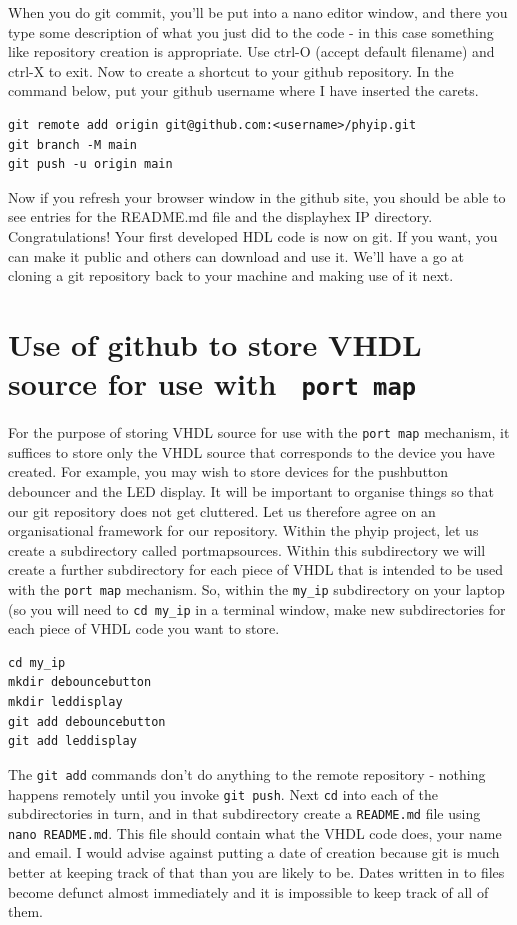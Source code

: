 \documentclass[../physical_computing.tex]{subfiles}
\begin{document}
When you do git commit, you'll be put into a nano editor window, and there you type some description of what you just did to the code - in this case
something like repository creation is appropriate. Use ctrl-O (accept default filename) and ctrl-X to exit. Now to create a shortcut to your github repository. In the command below, put your github username where I 
have inserted the carets.

\begin{verbatim}
git remote add origin git@github.com:<username>/phyip.git
git branch -M main
git push -u origin main
\end{verbatim}

Now if you refresh your browser window in the github site, you should be able to see entries for the README.md file and the displayhex IP directory. Congratulations! Your first developed HDL code is now on git. If you want, you can make it public and others can download and use it. We'll have a go at cloning a git repository back to your machine and making use of it next.

\section{Use of github to store VHDL source for use with \texttt{ port map}}
\label{sec:githubportmap}

For the purpose of storing VHDL source for use with the \texttt{port map} mechanism, it suffices to store only the VHDL source that corresponds to the device you have created. For example, you may wish to store devices for the pushbutton debouncer and the LED display. It will be important to organise things so that our git repository does not get cluttered. Let us therefore agree on an organisational framework for our repository. Within the phyip project, let us create a subdirectory called portmapsources. Within this subdirectory we will create a further subdirectory for each piece of VHDL that is intended to be used with the \texttt{port map} mechanism. So, within the \texttt{my\_ip} subdirectory on your laptop (so you will need to \texttt{cd my\_ip} in a terminal window, make new subdirectories for each piece of VHDL code you want to store.

\begin{verbatim}
cd my_ip
mkdir debouncebutton
mkdir leddisplay
git add debouncebutton
git add leddisplay
\end{verbatim}

The \texttt{git add} commands don't do anything to the remote repository - nothing happens remotely until you invoke \texttt{git push}. Next \texttt{cd} into each of the subdirectories in turn, and in that subdirectory create a \texttt{README.md} file using
\texttt{nano README.md}. This file should contain what the VHDL code does, your name and email. I would advise against putting a date of creation because git is much better at keeping track of that than you are likely to be. Dates written in to files become defunct almost immediately and it is impossible to keep track of all of them.
\end{document}
